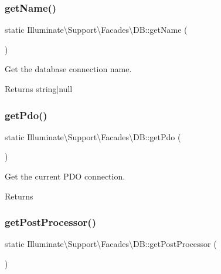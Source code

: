 \subsubsection{\texorpdfstring{get\+Name()}{getName()}}
{\footnotesize\ttfamily static Illuminate\textbackslash{}\+Support\textbackslash{}\+Facades\textbackslash{}\+D\+B\+::get\+Name (\begin{DoxyParamCaption}{ }\end{DoxyParamCaption})\hspace{0.3cm}{\ttfamily [static]}}

Get the database connection name.

\begin{DoxyReturn}{Returns}
string$\vert$null 
\end{DoxyReturn}
\mbox{\label{class_illuminate_1_1_support_1_1_facades_1_1_d_b_ad3501e92add7380a83baa4cfdfa7c9ad}} 
\subsubsection{\texorpdfstring{get\+Pdo()}{getPdo()}}
{\footnotesize\ttfamily static Illuminate\textbackslash{}\+Support\textbackslash{}\+Facades\textbackslash{}\+D\+B\+::get\+Pdo (\begin{DoxyParamCaption}{ }\end{DoxyParamCaption})\hspace{0.3cm}{\ttfamily [static]}}

Get the current P\+DO connection.

\begin{DoxyReturn}{Returns}

\end{DoxyReturn}
\mbox{\label{class_illuminate_1_1_support_1_1_facades_1_1_d_b_a0ac3adf5c9525dba15fe714c649ecadc}} 
\subsubsection{\texorpdfstring{get\+Post\+Processor()}{getPostProcessor()}}
{\footnotesize\ttfamily static Illuminate\textbackslash{}\+Support\textbackslash{}\+Facades\textbackslash{}\+D\+B\+::get\+Post\+Processor (\begin{DoxyParamCaption}{ }\end{DoxyParamCaption})\hspace{0.3cm}{\ttfamily [static]}}

